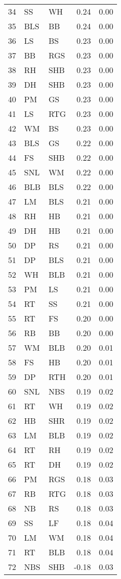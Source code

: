 \begin{table}[ht]
\begin{tabular}{rllrr}
  34 & SS & WH & 0.24 & 0.00 \\ 
  35 & BLS & BB & 0.24 & 0.00 \\ 
  36 & LS & BS & 0.23 & 0.00 \\ 
  37 & BB & RGS & 0.23 & 0.00 \\ 
  38 & RH & SHB & 0.23 & 0.00 \\ 
  39 & DH & SHB & 0.23 & 0.00 \\ 
  40 & PM & GS & 0.23 & 0.00 \\ 
  41 & LS & RTG & 0.23 & 0.00 \\ 
  42 & WM & BS & 0.23 & 0.00 \\ 
  43 & BLS & GS & 0.22 & 0.00 \\ 
  44 & FS & SHB & 0.22 & 0.00 \\ 
  45 & SNL & WM & 0.22 & 0.00 \\ 
  46 & BLB & BLS & 0.22 & 0.00 \\ 
  47 & LM & BLS & 0.21 & 0.00 \\ 
  48 & RH & HB & 0.21 & 0.00 \\ 
  49 & DH & HB & 0.21 & 0.00 \\ 
  50 & DP & RS & 0.21 & 0.00 \\ 
  51 & DP & BLS & 0.21 & 0.00 \\ 
  52 & WH & BLB & 0.21 & 0.00 \\ 
  53 & PM & LS & 0.21 & 0.00 \\ 
  54 & RT & SS & 0.21 & 0.00 \\ 
  55 & RT & FS & 0.20 & 0.00 \\ 
  56 & RB & BB & 0.20 & 0.00 \\ 
  57 & WM & BLB & 0.20 & 0.01 \\ 
  58 & FS & HB & 0.20 & 0.01 \\ 
  59 & DP & RTH & 0.20 & 0.01 \\ 
  60 & SNL & NBS & 0.19 & 0.02 \\ 
  61 & RT & WH & 0.19 & 0.02 \\ 
  62 & HB & SHR & 0.19 & 0.02 \\ 
  63 & LM & BLB & 0.19 & 0.02 \\ 
  64 & RT & RH & 0.19 & 0.02 \\ 
  65 & RT & DH & 0.19 & 0.02 \\ 
  66 & PM & RGS & 0.18 & 0.03 \\ 
  67 & RB & RTG & 0.18 & 0.03 \\ 
  68 & NB & RS & 0.18 & 0.03 \\ 
  69 & SS & LF & 0.18 & 0.04 \\ 
  70 & LM & WM & 0.18 & 0.04 \\ 
  71 & RT & BLB & 0.18 & 0.04 \\ 
  72 & NBS & SHB & -0.18 & 0.03 \\ 
   \hline
\end{tabular}
\end{table}